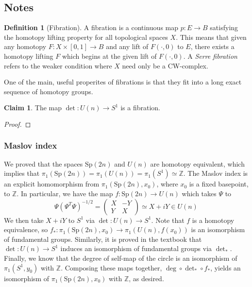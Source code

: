 \documentclass[aps,pra,showpacs,notitlepage,onecolumn,superscriptaddress,nofootinbib]{revtex4-1}
\theoremstyle{definition}
\newtheorem{definition}{Definition}[section]
\newtheorem{claim}{Claim}[section]
\begin{document}
\subsection{Notes}

\begin{definition}[Fibration]
  A fibration is a continuous map $p : E \rightarrow B$ satisfying the homotopy lifting property for all topological spaces $X$. This means that given any homotopy
  $F : X \times [0, 1] \rightarrow B$ and any lift of $F(\cdot, 0)$ to $E$, there exists a homotopy lifting $F$ which begins at the given lift of $F(\cdot, 0)$.
  A \emph{Serre fibration} refers to the weaker condition where $X$ need only be a CW-complex.
  \end{definition}

\noindent One of the main, useful properites of fibrations is that they fit into a long exact sequence of homotopy groups.

\begin{claim}
  The map $\det : U(n) \rightarrow S^1$ is a fibration.
  \end{claim}
\begin{proof}
  \end{proof}

\subsubsection{Maslov index}

\noindent We proved that the spaces $\text{Sp}(2n)$ and $U(n)$ are homotopy equivalent, which implies that $\pi_1(\text{Sp}(2n)) = \pi_1(U(n)) = \pi_1(S^1) \simeq \mathbb{Z}$. The Maslov index
is an explicit homomorphism from $\pi_1(\text{Sp}(2n), x_0)$, where $x_0$ is a fixed basepoint, to $\mathbb{Z}$. In particular, we have the map $f : \text{Sp}(2n) \rightarrow U(n)$ which takes
$\Psi$ to
\begin{equation}
\Psi (\Psi^{T} \Psi)^{-1/2} = \begin{pmatrix} X & -Y \\ Y & X \end{pmatrix} \simeq X + iY \in U(n)
\end{equation}
We then take $X + iY$ to $S^1$ via $\det : U(n) \rightarrow S^1$. Note that $f$ is a homotopy equivalence, so $f_{*} : \pi_1(\text{Sp}(2n), x_0) \rightarrow \pi_1(U(n), f(x_0))$ is an isomorphism of fundamental groups.
Similarly, it is proved in the textbook that $\det : U(n) \rightarrow S^1$ induces an isomorphism of fundamental groups via $\det_{*}$. Finally, we know that the degree of self-map of the circle is an isomorphism
of $\pi_1(S^1, y_0)$ with $\mathbb{Z}$. Composing these maps together, $\deg \circ \det_{*} \circ f_{*}$, yields an isomorphism of $\pi_1(\text{Sp}(2n), x_0)$ with $\mathbb{Z}$, as desired.
\end{document}
